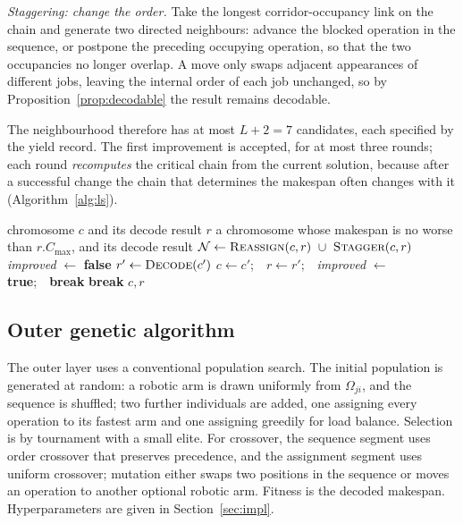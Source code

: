 \emph{Staggering: change the order.} Take the longest corridor-occupancy link on the chain and generate two directed neighbours: advance the blocked operation in the sequence, or postpone the preceding occupying operation, so that the two occupancies no longer overlap.
A move only swaps adjacent appearances of different jobs, leaving the internal order of each job unchanged, so by Proposition~\ref{prop:decodable} the result remains decodable.

The neighbourhood therefore has at most $L+2=7$ candidates, each specified by the yield record. The first improvement is accepted, for at most three rounds; each round \emph{recomputes} the critical chain from the current solution, because after a successful change the chain that determines the makespan often changes with it (Algorithm~\ref{alg:ls}).

\begin{algorithm}[t]
\caption{\textsc{ContentionGuidedSearch}: yield-record-guided local search}
\label{alg:ls}
\small
\begin{algorithmic}[1]
\Require chromosome $c$ and its decode result $r$
\Ensure a chromosome whose makespan is no worse than $r.C_{\max}$, and its decode result
  \State $\mathcal{N}\gets\textsc{Reassign}(c,r)\ \cup\ \textsc{Stagger}(c,r)$
  \State \textit{improved} $\gets$ \textbf{false}
    \State $r'\gets\textsc{Decode}(c')$
      \State $c\gets c'$;\ \ $r\gets r'$;\ \ \textit{improved} $\gets$
             \textbf{true};\ \ \textbf{break}
    \EndIf
  \EndFor
   \State \textbf{break} \EndIf
\EndFor
\State \Return $c,r$
\end{algorithmic}
\end{algorithm}

\subsection{Outer genetic algorithm}

The outer layer uses a conventional population search.
The initial population is generated at random: a robotic arm is drawn uniformly from $\Omega_{ji}$, and the sequence is shuffled; two further individuals are added, one assigning every operation to its fastest arm and one assigning greedily for load balance.
Selection is by tournament with a small elite. For crossover, the sequence segment uses order crossover that preserves precedence, and the assignment segment uses uniform crossover; mutation either swaps two positions in the sequence or moves an operation to another optional robotic arm.
Fitness is the decoded makespan. Hyperparameters are given in Section~\ref{sec:impl}.


